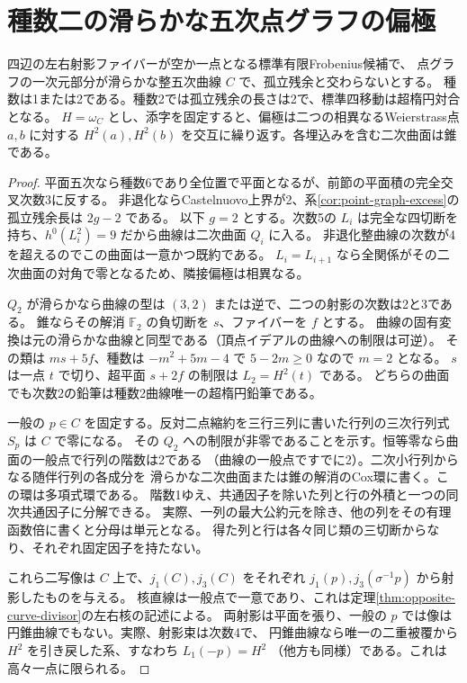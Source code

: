 \section{種数二の滑らかな五次点グラフの偏極}
\label{sec:genus-two-quintic-ruling}
\begin{theorem}\label{thm:genus-two-quintic-ruling}
四辺の左右射影ファイバーが空か一点となる標準有限Frobenius候補で、
点グラフの一次元部分が滑らかな整五次曲線 $C$ で、孤立残余と交わらないとする。
種数は1または2である。種数2では孤立残余の長さは2で、標準四移動は超楕円対合となる。
$H=\omega_C$ とし、添字を固定すると、偏極は二つの相異なるWeierstrass点 $a,b$ に対する
$H^2(a),H^2(b)$ を交互に繰り返す。各埋込みを含む二次曲面は錐である。
\end{theorem}
\begin{proof}
平面五次なら種数6であり全位置で平面となるが、前節の平面積の完全交叉次数3に反する。
非退化ならCastelnuovo上界が2、系\ref{cor:point-graph-excess}の孤立残余長は $2g-2$ である。
以下 $g=2$ とする。次数5の $L_i$ は完全な四切断を持ち、$h^0(L_i^2)=9$ だから曲線は二次曲面 $Q_i$ に入る。
非退化整曲線の次数が4を超えるのでこの曲面は一意かつ既約である。
$L_i=L_{i+1}$ なら全関係がその二次曲面の対角で零となるため、隣接偏極は相異なる。

$Q_2$ が滑らかなら曲線の型は $(3,2)$ または逆で、二つの射影の次数は2と3である。
錐ならその解消 $\mathbb F_2$ の負切断を $s$、ファイバーを $f$ とする。
曲線の固有変換は元の滑らかな曲線と同型である（頂点イデアルの曲線への制限は可逆）。
その類は $ms+5f$、種数は $-m^2+5m-4$ で $5-2m\ge0$ なので $m=2$ となる。
$s$ は一点 $t$ で切り、超平面 $s+2f$ の制限は $L_2=H^2(t)$ である。
どちらの曲面でも次数2の鉛筆は種数2曲線唯一の超楕円鉛筆である。

一般の $p\in C$ を固定する。反対二点縮約を三行三列に書いた行列の三次行列式 $S_p$ は $C$ で零になる。
その $Q_2$ への制限が非零であることを示す。恒等零なら曲面の一般点で行列の階数は2である
（曲線の一般点ですでに2）。二次小行列からなる随伴行列の各成分を
滑らかな二次曲面または錐の解消のCox環に書く。この環は多項式環である。
階数1ゆえ、共通因子を除いた列と行の外積と一つの同次共通因子に分解できる。
実際、一列の最大公約元を除き、他の列をその有理函数倍に書くと分母は単元となる。
得た列と行は各々同じ類の三切断からなり、それぞれ固定因子を持たない。

これら二写像は $C$ 上で、$j_1(C),j_3(C)$ をそれぞれ $j_1(p),j_3(\sigma^{-1}p)$ から射影したものを与える。
核直線は一般点で一意であり、これは定理\ref{thm:opposite-curve-divisor}の左右核の記述による。
両射影は平面を張り、一般の $p$ では像は円錐曲線でもない。実際、射影束は次数4で、
円錐曲線なら唯一の二重被覆から $H^2$ を引き戻した系、すなわち $L_1(-p)=H^2$
（他方も同様）である。これは高々一点に限られる。


\end{proof}
